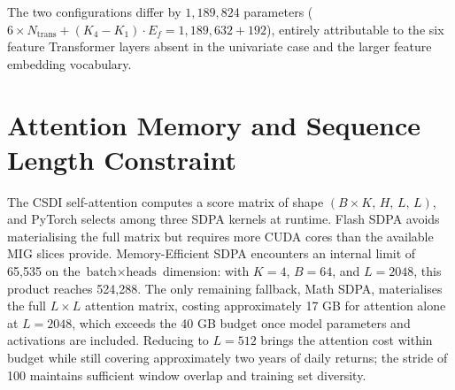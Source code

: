 The two configurations differ by $1{,}189{,}824$ parameters
($6 \times N_{\mathrm{trans}} + (K_4 - K_1)\cdot E_f
= 1{,}189{,}632 + 192$),
entirely attributable to the six feature Transformer layers absent in the
univariate case and the larger feature embedding vocabulary.

\section{Attention Memory and Sequence Length Constraint}
\label{app:sec:attention_memory}

The CSDI self-attention computes a score matrix of shape \((B \times K,\, H,\, L,\, L)\), and
PyTorch selects among three SDPA kernels at runtime. Flash SDPA avoids materialising
the full matrix but requires more CUDA cores than the available MIG slices provide.
Memory-Efficient SDPA encounters an internal limit of 65,535 on the
\(\text{batch} \times \text{heads}\) dimension: with \(K = 4\), \(B = 64\), and
\(L = 2048\), this product reaches 524,288. The only remaining fallback, Math SDPA,
materialises the full \(L \times L\) attention matrix, costing approximately 17 GB for
attention alone at \(L = 2048\), which exceeds the 40 GB budget once model parameters
and activations are included. Reducing to \(L = 512\) brings the attention cost within
budget while still covering approximately two years of daily returns; the stride of 100
maintains sufficient window overlap and training set diversity.